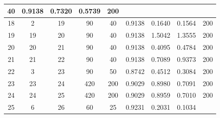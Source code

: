 \documentclass[12pt]{article}
\begin{document}
\begin{table}[htbp]
{\begin{tabular}{|ccccccccc|}
				\multicolumn{1}{c|}{40} &
				\multicolumn{1}{c|}{0.9138} &
				\multicolumn{1}{c|}{0.7320} &
				\multicolumn{1}{c|}{0.5739} &
				200 \\ \hline
				\multicolumn{1}{|c|}{18} &
				\multicolumn{1}{c|}{2} &
				\multicolumn{1}{c|}{19} &
				\multicolumn{1}{c|}{90} &
				\multicolumn{1}{c|}{40} &
				\multicolumn{1}{c|}{0.9138} &
				\multicolumn{1}{c|}{0.1640} &
				\multicolumn{1}{c|}{0.1564} &
				200 \\ \hline
				\multicolumn{1}{|c|}{19} &
				\multicolumn{1}{c|}{19} &
				\multicolumn{1}{c|}{20} &
				\multicolumn{1}{c|}{90} &
				\multicolumn{1}{c|}{40} &
				\multicolumn{1}{c|}{0.9138} &
				\multicolumn{1}{c|}{1.5042} &
				\multicolumn{1}{c|}{1.3555} &
				200 \\ \hline
				\multicolumn{1}{|c|}{20} &
				\multicolumn{1}{c|}{20} &
				\multicolumn{1}{c|}{21} &
				\multicolumn{1}{c|}{90} &
				\multicolumn{1}{c|}{40} &
				\multicolumn{1}{c|}{0.9138} &
				\multicolumn{1}{c|}{0.4095} &
				\multicolumn{1}{c|}{0.4784} &
				200 \\ \hline
				\multicolumn{1}{|c|}{21} &
				\multicolumn{1}{c|}{21} &
				\multicolumn{1}{c|}{22} &
				\multicolumn{1}{c|}{90} &
				\multicolumn{1}{c|}{40} &
				\multicolumn{1}{c|}{0.9138} &
				\multicolumn{1}{c|}{0.7089} &
				\multicolumn{1}{c|}{0.9373} &
				200 \\ \hline
				\multicolumn{1}{|c|}{22} &
				\multicolumn{1}{c|}{3} &
				\multicolumn{1}{c|}{23} &
				\multicolumn{1}{c|}{90} &
				\multicolumn{1}{c|}{50} &
				\multicolumn{1}{c|}{0.8742} &
				\multicolumn{1}{c|}{0.4512} &
				\multicolumn{1}{c|}{0.3084} &
				200 \\ \hline
				\multicolumn{1}{|c|}{23} &
				\multicolumn{1}{c|}{23} &
				\multicolumn{1}{c|}{24} &
				\multicolumn{1}{c|}{420} &
				\multicolumn{1}{c|}{200} &
				\multicolumn{1}{c|}{0.9029} &
				\multicolumn{1}{c|}{0.8980} &
				\multicolumn{1}{c|}{0.7091} &
				200 \\ \hline
				\multicolumn{1}{|c|}{24} &
				\multicolumn{1}{c|}{24} &
				\multicolumn{1}{c|}{25} &
				\multicolumn{1}{c|}{420} &
				\multicolumn{1}{c|}{200} &
				\multicolumn{1}{c|}{0.9029} &
				\multicolumn{1}{c|}{0.8959} &
				\multicolumn{1}{c|}{0.7010} &
				200 \\ \hline
				\multicolumn{1}{|c|}{25} &
				\multicolumn{1}{c|}{6} &
				\multicolumn{1}{c|}{26} &
				\multicolumn{1}{c|}{60} &
				\multicolumn{1}{c|}{25} &
				\multicolumn{1}{c|}{0.9231} &
				\multicolumn{1}{c|}{0.2031} &
				\multicolumn{1}{c|}{0.1034} &

\end{tabular}}
\end{table}
\end{document}
